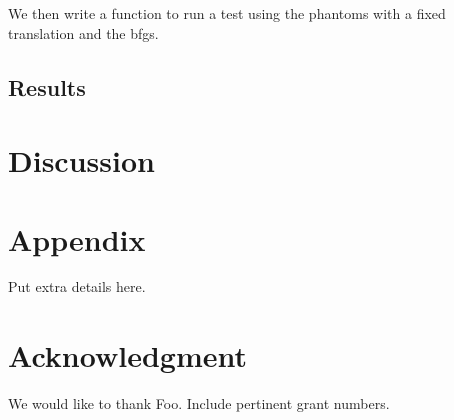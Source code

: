 \documentclass[]{article}
\begin{document}
We then write a function to run a test using the phantoms with a fixed
translation and the bfgs.

\subsection{Results}

\section{Discussion}

\section*{Appendix}
Put extra details here.

\section*{Acknowledgment}
We would like to thank Foo. Include pertinent grant numbers.



\end{document}
